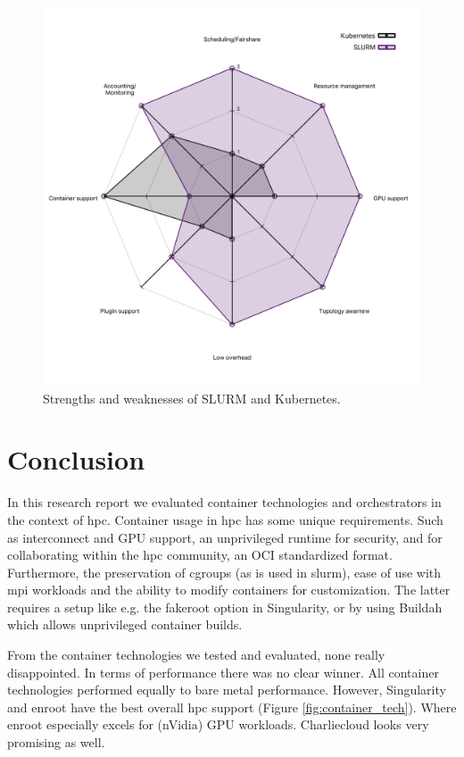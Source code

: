 \documentclass[12pt]{article}
\begin{document}
\begin{figure}[H]
\centering
\includegraphics[scale=0.35]{images/kuber.pdf}
\caption{Strengths and weaknesses of SLURM and Kubernetes.}
\label{fig:kube_vs_slurm}
\end{figure}


\section{Conclusion}
In this research report we evaluated container technologies and orchestrators in the context of \gls{hpc}. Container usage in \gls{hpc} has some unique requirements. Such as interconnect and GPU support, an unprivileged runtime for security, and for collaborating within the \gls{hpc} community, an OCI standardized format. Furthermore, the preservation of cgroups (as is used in \gls{slurm}), ease of use with \gls{mpi} workloads and the ability to modify containers for customization. The latter requires a setup like e.g. the fakeroot option in Singularity, or by using Buildah which allows unprivileged container builds.

From the container technologies we tested and evaluated, none really disappointed. In terms of performance there was no clear winner. All container technologies performed equally to bare metal performance. However, Singularity and enroot have the best overall \gls{hpc} support (Figure \ref{fig:container_tech}). Where enroot especially excels for (nVidia) GPU workloads. Charliecloud looks very promising as well.
\end{document}
